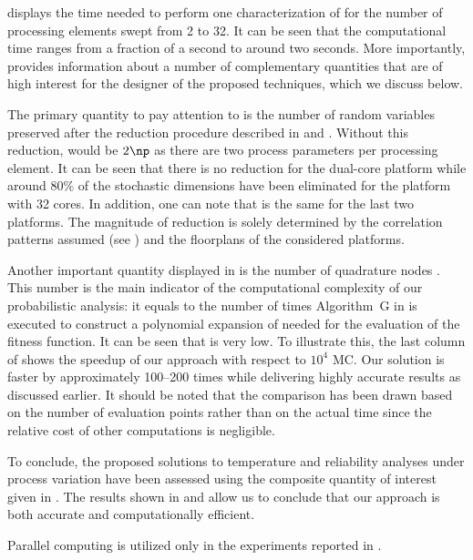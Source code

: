  displays the time needed to perform one characterization of \vq for
the number of processing elements \np swept from 2 to 32. It can be seen that
the computational time ranges from a fraction of a second to around two seconds.
More importantly,  provides information about a number of
complementary quantities that are of high interest for the designer of the
proposed techniques, which we discuss below.

The primary quantity to pay attention to is the number of random variables \nz
preserved after the reduction procedure described in  and
. Without this reduction, \nz would be $2 \np$ as
there are two process parameters per processing element. It can be seen that
there is no reduction for the dual-core platform while around 80\% of the
stochastic dimensions have been eliminated for the platform with 32 cores. In
addition, one can note that \nz is the same for the last two platforms. The
magnitude of reduction is solely determined by the correlation patterns assumed
(see ) and the floorplans of the considered platforms.

Another important quantity displayed in  is the number of quadrature
nodes \nq. This number is the main indicator of the computational complexity of
our probabilistic analysis: it equals to the number of times Algorithm~G in
 is executed to construct a polynomial expansion of
 needed for the evaluation of the fitness function.
It can be seen that \nq is very low. To illustrate this, the last column of
 shows the speedup of our approach with respect to $10^4$ \ac{MC}.
Our solution is faster by approximately 100--200 times while delivering highly
accurate results as discussed earlier. It should be noted that the comparison
has been drawn based on the number of evaluation points rather than on the
actual time since the relative cost of other computations is negligible.

To conclude, the proposed solutions to temperature and reliability analyses
under process variation have been assessed using the composite quantity of
interest given in . The results shown in
 and  allow us to conclude that our approach is both
accurate and computationally efficient.


Parallel computing is utilized only in the experiments reported in
.

